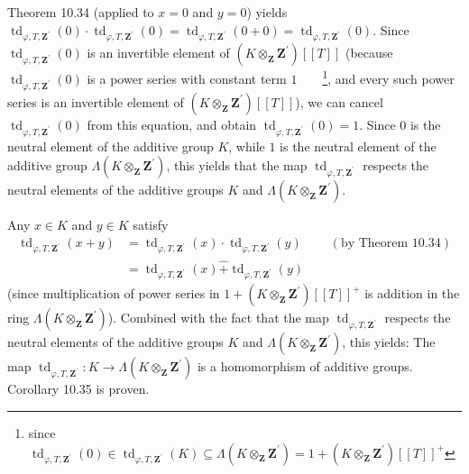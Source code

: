 \documentclass[numbers=enddot,12pt,final,onecolumn,notitlepage]{scrartcl}%
\begin{document}
Theorem 10.34 (applied to $x=0$ and $y=0$) yields $\operatorname*{td}%
\nolimits_{\varphi,T,\mathbf{Z}^{\prime}}\left(  0\right)  \cdot
\operatorname*{td}\nolimits_{\varphi,T,\mathbf{Z}^{\prime}}\left(  0\right)
=\operatorname*{td}\nolimits_{\varphi,T,\mathbf{Z}^{\prime}}\left(
0+0\right)  =\operatorname*{td}\nolimits_{\varphi,T,\mathbf{Z}^{\prime}%
}\left(  0\right)  $. Since $\operatorname*{td}\nolimits_{\varphi
,T,\mathbf{Z}^{\prime}}\left(  0\right)  $ is an invertible element of
$\left(  K\otimes_{\mathbf{Z}}\mathbf{Z}^{\prime}\right)  \left[  \left[
T\right]  \right]  $ (because $\operatorname*{td}\nolimits_{\varphi
,T,\mathbf{Z}^{\prime}}\left(  0\right)  $ is a power series with constant
term $1$\ \ \ \ \footnote{since $\operatorname*{td}\nolimits_{\varphi
,T,\mathbf{Z}^{\prime}}\left(  0\right)  \in\operatorname*{td}%
\nolimits_{\varphi,T,\mathbf{Z}^{\prime}}\left(  K\right)  \subseteq
\Lambda\left(  K\otimes_{\mathbf{Z}}\mathbf{Z}^{\prime}\right)  =1+\left(
K\otimes_{\mathbf{Z}}\mathbf{Z}^{\prime}\right)  \left[  \left[  T\right]
\right]  ^{+}$}, and every such power series is an invertible element of
$\left(  K\otimes_{\mathbf{Z}}\mathbf{Z}^{\prime}\right)  \left[  \left[
T\right]  \right]  $), we can cancel $\operatorname*{td}\nolimits_{\varphi
,T,\mathbf{Z}^{\prime}}\left(  0\right)  $ from this equation, and obtain
$\operatorname*{td}\nolimits_{\varphi,T,\mathbf{Z}^{\prime}}\left(  0\right)
=1$. Since $0$ is the neutral element of the additive group $K$, while $1$ is
the neutral element of the additive group $\Lambda\left(  K\otimes
_{\mathbf{Z}}\mathbf{Z}^{\prime}\right)  $, this yields that the map
$\operatorname*{td}\nolimits_{\varphi,T,\mathbf{Z}^{\prime}}$ respects the
neutral elements of the additive groups $K$ and $\Lambda\left(  K\otimes
_{\mathbf{Z}}\mathbf{Z}^{\prime}\right)  $.

Any $x\in K$ and $y\in K$ satisfy%
\begin{align*}
\operatorname*{td}\nolimits_{\varphi,T,\mathbf{Z}^{\prime}}\left(  x+y\right)
&  =\operatorname*{td}\nolimits_{\varphi,T,\mathbf{Z}^{\prime}}\left(
x\right)  \cdot\operatorname*{td}\nolimits_{\varphi,T,\mathbf{Z}^{\prime}%
}\left(  y\right)  \ \ \ \ \ \ \ \ \ \ \left(  \text{by Theorem 10.34}\right)
\\
&  =\operatorname*{td}\nolimits_{\varphi,T,\mathbf{Z}^{\prime}}\left(
x\right)  \widehat{+}\operatorname*{td}\nolimits_{\varphi,T,\mathbf{Z}%
^{\prime}}\left(  y\right)
\end{align*}
(since multiplication of power series in $1+\left(  K\otimes_{\mathbf{Z}%
}\mathbf{Z}^{\prime}\right)  \left[  \left[  T\right]  \right]  ^{+}$ is
addition in the ring $\Lambda\left(  K\otimes_{\mathbf{Z}}\mathbf{Z}^{\prime
}\right)  $). Combined with the fact that the map $\operatorname*{td}%
\nolimits_{\varphi,T,\mathbf{Z}^{\prime}}$ respects the neutral elements of
the additive groups $K$ and $\Lambda\left(  K\otimes_{\mathbf{Z}}%
\mathbf{Z}^{\prime}\right)  $, this yields: The map $\operatorname*{td}%
_{\varphi,T,\mathbf{Z}^{\prime}}:K\rightarrow\Lambda\left(  K\otimes
_{\mathbf{Z}}\mathbf{Z}^{\prime}\right)  $ is a homomorphism of additive
groups. Corollary 10.35 is proven.
\end{document}
